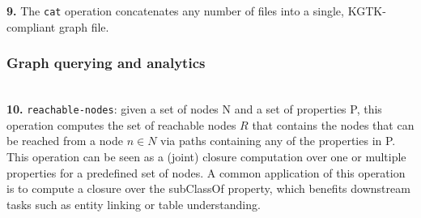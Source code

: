 \documentclass[runningheads]{llncs}
\newcommand{\kibitz}[2]{%
{\color{#1}#2}{}%
}
\newcommand{\filip}[1]{\kibitz{purple}{[FI:#1]}} %
\newcommand{\DS}[1]{\kibitz{blue}{[DS: #1]}} %
\newcommand{\DG}[1]{\kibitz{red}{[DG: #1]}} %
\begin{document}

\textbf{9.} The \texttt{cat} operation concatenates any number of files into a single, KGTK-compliant graph file. %





\subsubsection{Graph querying and analytics}~\\


\textbf{10.} \texttt{reachable-nodes}: given a set of nodes N and a set of properties P, this operation computes the set of reachable nodes $R$ that contains the nodes that can be reached from a node $n \in N$ via paths containing any of the properties in P. This operation can be seen as a (joint) closure computation over one or multiple properties for a predefined set of nodes. A common application of this operation is to compute a closure over the subClassOf property, which benefits downstream tasks such as entity linking or table understanding. %
\end{document}

